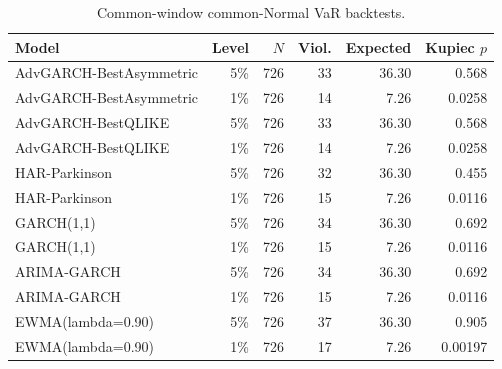 \begin{table}[!t]
\centering
\caption{Common-window common-Normal VaR backtests.}
\label{tab:common-window-var-backtests}
\scriptsize
\begin{tabular}{@{}L{0.38\columnwidth}rrrrr@{}}
\toprule
Model & Level & \(N\) & Viol. & Expected & Kupiec \(p\) \\
\midrule
AdvGARCH-BestAsymmetric & 5\% & 726 & 33 & 36.30 & 0.568 \\
AdvGARCH-BestAsymmetric & 1\% & 726 & 14 & 7.26 & 0.0258 \\
AdvGARCH-BestQLIKE & 5\% & 726 & 33 & 36.30 & 0.568 \\
AdvGARCH-BestQLIKE & 1\% & 726 & 14 & 7.26 & 0.0258 \\
HAR-Parkinson & 5\% & 726 & 32 & 36.30 & 0.455 \\
HAR-Parkinson & 1\% & 726 & 15 & 7.26 & 0.0116 \\
GARCH(1,1) & 5\% & 726 & 34 & 36.30 & 0.692 \\
GARCH(1,1) & 1\% & 726 & 15 & 7.26 & 0.0116 \\
ARIMA-GARCH & 5\% & 726 & 34 & 36.30 & 0.692 \\
ARIMA-GARCH & 1\% & 726 & 15 & 7.26 & 0.0116 \\
EWMA(lambda=0.90) & 5\% & 726 & 37 & 36.30 & 0.905 \\
EWMA(lambda=0.90) & 1\% & 726 & 17 & 7.26 & 0.00197 \\
\bottomrule
\end{tabular}
\end{table}

